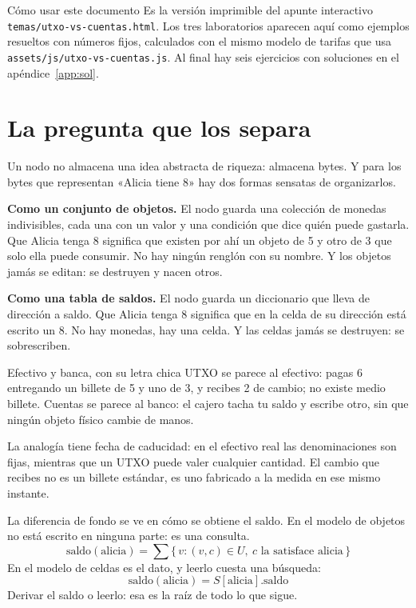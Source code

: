 \documentclass[11pt,a4paper]{article}
\theoremstyle{definition}
\theoremstyle{plain}
\theoremstyle{remark}
\begin{document}
\tableofcontents
\clearpage

\begin{nota}{Cómo usar este documento}
Es la versión imprimible del apunte interactivo
\texttt{temas/utxo-vs-cuentas.html}. Los tres laboratorios aparecen aquí como
ejemplos resueltos con números fijos, calculados con el mismo modelo de tarifas
que usa \texttt{assets/js/utxo-vs-cuentas.js}. Al final hay seis ejercicios con
soluciones en el apéndice~\ref{app:sol}.
\end{nota}

\section{La pregunta que los separa}\label{sec:pregunta}

Un nodo no almacena una idea abstracta de riqueza: almacena bytes. Y para los
bytes que representan «Alicia tiene 8» hay dos formas sensatas de organizarlos.

\textbf{Como un conjunto de objetos.} El nodo guarda una colección de monedas
indivisibles, cada una con un valor y una condición que dice quién puede
gastarla. Que Alicia tenga 8 significa que existen por ahí un objeto de 5 y otro
de 3 que solo ella puede consumir. No hay ningún renglón con su nombre. Y los
objetos jamás se editan: se destruyen y nacen otros.

\textbf{Como una tabla de saldos.} El nodo guarda un diccionario que lleva de
dirección a saldo. Que Alicia tenga 8 significa que en la celda de su dirección
está escrito un 8. No hay monedas, hay una celda. Y las celdas jamás se
destruyen: se sobrescriben.

\begin{clave}{Efectivo y banca, con su letra chica}
UTXO se parece al efectivo: pagas 6 entregando un billete de 5 y uno de 3, y
recibes 2 de cambio; no existe medio billete. Cuentas se parece al banco: el
cajero tacha tu saldo y escribe otro, sin que ningún objeto físico cambie de
manos.

La analogía tiene fecha de caducidad: en el efectivo real las denominaciones son
fijas, mientras que un UTXO puede valer cualquier cantidad. El cambio que recibes
no es un billete estándar, es uno fabricado a la medida en ese mismo instante.
\end{clave}

La diferencia de fondo se ve en cómo se obtiene el saldo. En el modelo de objetos
no está escrito en ninguna parte: es una consulta.
\[
  \mathrm{saldo}(\text{alicia}) = \sum \{\, v : (v,c) \in U,\ c \text{ la satisface alicia} \,\}
\]
En el modelo de celdas es el dato, y leerlo cuesta una búsqueda:
\[
  \mathrm{saldo}(\text{alicia}) = S[\text{alicia}].\text{saldo}
\]
Derivar el saldo o leerlo: esa es la raíz de todo lo que sigue.
\end{document}
